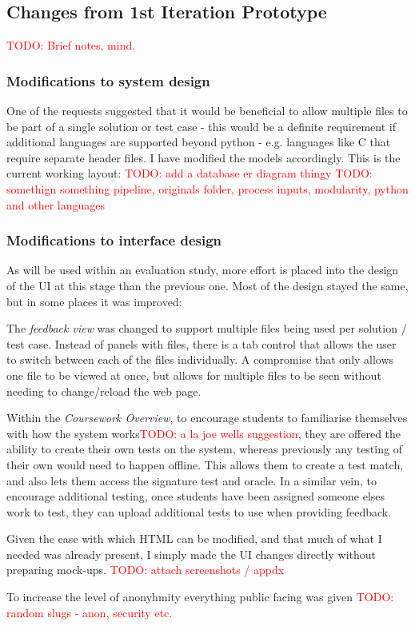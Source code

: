 \documentclass[a4paper,11pt]{report}
\newcommand{\todo}[1]{\textcolor{red}{TODO: #1}}
\begin{document}
\subsection{Changes from 1st Iteration Prototype}
\todo{Brief notes, mind.}
\subsubsection{Modifications to system design}
One of the requests suggested that it would be beneficial to allow multiple files to be part of a single solution or test case - this would be a definite requirement if additional languages are supported beyond python - e.g. languages like C that require separate header files. I have modified the models accordingly. This is the current working layout:
\todo{add a database er diagram thingy}
\todo{somethign something pipeline, originals folder, process inputs, modularity, python and other languages}
\subsubsection{Modifications to interface design}
As will be used within an evaluation study, more effort is placed into the design of the UI at this stage than the previous one. Most of the design stayed the same, but in some places it was improved:\par
The \textit{feedback view} was changed to support multiple files being used per solution / test case. Instead of panels with files, there is a tab control that allows the user to switch between each of the files individually. A compromise that only allows one file to be viewed at once, but allows for multiple files to be seen without needing to change/reload the web page.\par
Within the \textit{Coursework Overview}, to encourage students to familiarise themselves with how the system works\todo{a la joe wells suggestion}, they are offered the ability to create their own tests on the system, whereas previously any testing of their own would need to happen offline. This allows them to create a test match, and also lets them access the signature test and oracle. In a similar vein, to encourage additional testing, once students have been assigned someone elses work to test, they can upload additional tests to use when providing feedback.\par
Given the ease with which HTML can be modified, and that much of what I needed was already present, I simply made the UI changes directly without preparing mock-ups. \todo{attach screenshots / appdx}\par
To increase the level of anonyhmity everything public facing was given \todo{random slugs - anon, security etc.}
\end{document}
